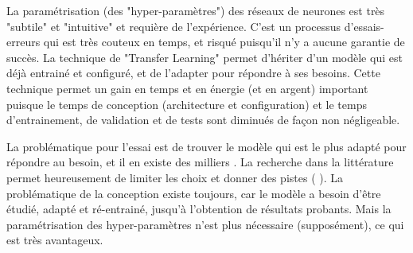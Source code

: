 \par La paramétrisation (des "hyper-paramètres") des réseaux de neurones est très "subtile" et "intuitive" et requière de l'expérience. C'est un processus d'essais-erreurs qui est très couteux en temps, et risqué puisqu'il n'y a aucune garantie de succès. La technique de "Transfer Learning" permet d'hériter d'un modèle qui est déjà entrainé et configuré, et de l'adapter pour répondre à ses besoins. Cette technique permet un gain en temps et en énergie (et en argent) important puisque le temps de conception (architecture et configuration) et le temps d'entrainement, de validation et de tests sont diminués de façon non négligeable.
\begin{comment}
Par exemple le modèle "VGG" prend 2-3 semaines d'entrainement \cite{simonyan_very_2015} avec 4 GPU Titan Black (NVIDIA), coutant 1,200\$US (Amazon.com) chacun (pour un total de 4,800\$US, et cela juste pour les GPUs, qui ne sont qu'un des éléments de l'infrastructure nécessaire). Étant donné que de multiples tentatives sont nécessaires (cycles essai-erreur), la stratégie est d'entrainer plusieurs modèles en parallèle afin d'accélérer le développement, ce qui implique un cout élevé en infrastructure.
\end{comment}
La problématique pour l'essai est de trouver le modèle qui est le plus adapté pour répondre au besoin, et il en existe des milliers \cite{koh_model_2018}. La recherche dans la littérature permet heureusement de limiter les choix et donner des pistes (\cite{jia_real-time_2020} \cite{nguyen_mavnet_2019} \cite{nvidia_jetson_2019-1}). La problématique de la conception existe toujours, car le modèle a besoin d'être étudié, adapté et ré-entrainé, jusqu'à l'obtention de résultats probants. Mais la paramétrisation des hyper-paramètres n'est plus nécessaire (supposément), ce qui est très avantageux.

